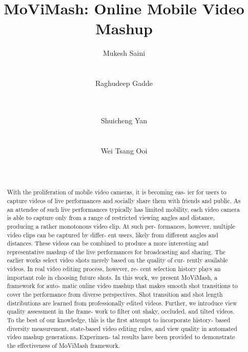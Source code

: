 \documentclass{sig-alternate}
\begin{document}
%


\title{MoViMash: Online Mobile Video Mashup}


\author{
\alignauthor
Mukesh Saini\\
       \\
       \\
\alignauthor Raghudeep Gadde \\
       \\
       \\
\and 
\alignauthor Shuicheng Yan\\
       \\
       \\
\alignauthor Wei Tsang Ooi\\
       \\
       \\
}

\maketitle
\begin{abstract}
With the proliferation of mobile video cameras, it is becoming eas-
ier for users to capture videos of live performances and socially
share them with friends and public. As an attendee of such live
performances typically has limited mobility, each video camera is
able to capture only from a range of restricted viewing angles and
distance, producing a rather monotonous video clip. At such per-
formances, however, multiple video clips can be captured by differ-
ent users, likely from different angles and distances. These videos
can be combined to produce a more interesting and representative
mashup of the live performances for broadcasting and sharing. The
earlier works select video shots merely based on the quality of cur-
rently available videos. In real video editing process, however, re-
cent selection history plays an important role in choosing future
shots. In this work, we present MoViMash, a framework for auto-
matic online video mashup that makes smooth shot transitions to
cover the performance from diverse perspectives. Shot transition
and shot length distributions are learned from professionally edited
videos. Further, we introduce view quality assessment in the frame-
work to filter out shaky, occluded, and tilted videos. To the best
of our knowledge, this is the first attempt to incorporate history-
based diversity measurement, state-based video editing rules, and
view quality in automated video mashup generations. Experimen-
tal results have been provided to demonstrate the effectiveness of
MoViMash framework.
\end{abstract}
\end{document}
